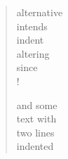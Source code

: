 \begin{verse}
alternative \\
\vin intends \\
indent \\
\vin altering \\
since \\!

and some \\
\vin text with \\
\vin two lines \\
indented \\
\end{verse}
